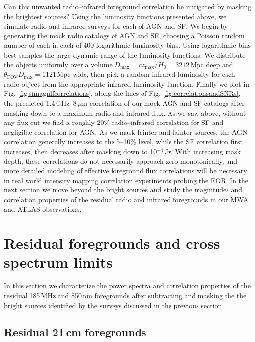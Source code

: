 \documentclass[numberedappendix]{emulateapj}
\newcommand{\maxtext}{\text{max}}
\begin{document}
Can this unwanted radio--infrared foreground correlation be mitigated by masking the brightest sources? Using the luminosity functions presented above, we simulate radio and infrared surveys for each of AGN and SF. We begin by generating the mock radio catalogs of AGN and SF, choosing a Poisson random number of each in each of 400 logarithmic luminosity bins. Using logarithmic bins best samples the large dynamic range of the luminosity functions. We distribute the objects uniformly over a volume $D_\maxtext=cz_\maxtext/H_0=3212$\,Mpc deep and $\theta_{\text{FOV}}D_\maxtext=1121$\,Mpc wide, then pick a random infrared luminosity for each radio object from the appropriate infrared luminosity function. Finally we plot in Fig. \ref{fig:simagnlfcorrelations}, along the lines of Fig. \ref{fig:correlationsandSNRs}, the predicted 1.4\,GHz--8\,$\mu$m correlation of our mock AGN and SF catalogs after masking down to a maximum radio and infrared flux. As we saw above, without any flux cut we find a roughly 20\% radio--infrared correlation for SF and negligible correlation for AGN. As we mask fainter and fainter sources, the AGN correlation generally increases to the 5--10\% level, while the SF correlation first increases, then decreases after masking down to 10$^{-4}$\,Jy. With increasing mask depth, these correlations do not necessarily approach zero monotonically, and more detailed modeling of effective foreground flux correlations will be necessary in real world intensity mapping correlation experiments probing the EOR. In the next section we move beyond the bright sources and study the magnitudes and correlation properties of the residual radio and infrared foregrounds in our MWA and ATLAS observations.


\section{Residual foregrounds and cross spectrum limits}

In this section we characterize the power spectra and correlation properties of the residual 185\,MHz and 850\,nm foregrounds after subtracting and masking  the the bright sources identified by the surveys discussed in the previous section.

\subsection{Residual 21\,cm foregrounds}
\label{sec:res21fgs}
\end{document}
